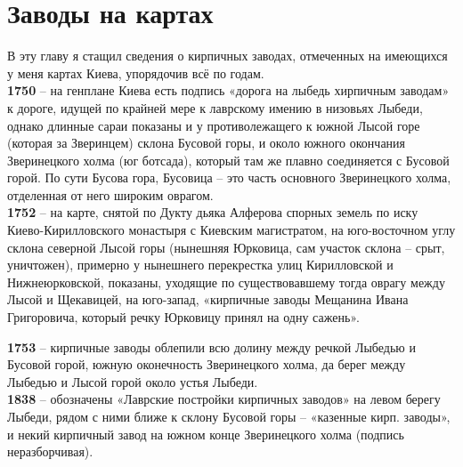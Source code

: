 \chapter{Заводы на картах}

В эту главу я стащил сведения о кирпичных заводах, отмеченных на имеющихся у меня картах Киева, упорядочив всё по годам.\\

\noindent\textbf{1750} – на генплане Киева есть подпись «дорога на лыбедь хирпичным заводам» к дороге, идущей по крайней мере к лаврскому имению в низовьях Лыбеди, однако длинные сараи показаны и у противолежащего к южной Лысой горе (которая за Зверинцем) склона Бусовой горы, и около южного окончания Зверинецкого холма (юг ботсада), который там же плавно соединяется с Бусовой горой. По сути Бусова гора, Бусовица – это часть основного Зверинецкого холма, отделенная от него широким оврагом.\\

\noindent\textbf{1752} – на карте, снятой по Дукту дьяка Алферова спорных земель по иску Киево-Кирилловского монастыря с Киевским магистратом, на юго-восточном углу склона северной Лысой горы (нынешняя Юрковица, сам участок склона – срыт, уничтожен), примерно у нынешнего перекрестка улиц Кирилловской и Нижнеюрковской, показаны, уходящие по существовавшему тогда оврагу между Лысой и Щекавицей, на юго-запад, «кирпичные заводы Мещанина Ивана Григоровича, который речку Юрковицу принял на одну сажень».

\noindent\textbf{1753} – кирпичные заводы облепили всю долину между речкой Лыбедью и Бусовой горой, южную оконечность Зверинецкого холма, да берег между Лыбедью и Лысой горой около устья Лыбеди.\\



\noindent\textbf{1838} – обозначены «Лаврские постройки кирпичных заводов» на левом берегу Лыбеди, рядом с ними ближе к склону Бусовой горы – «казенные кирп. заводы», и некий кирпичный завод на южном конце Зверинецкого холма (подпись неразборчивая).\\

